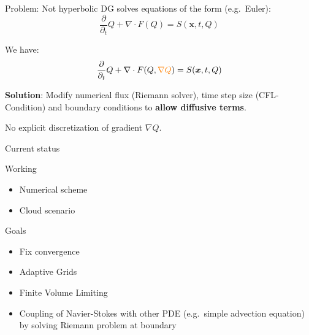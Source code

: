 \documentclass{beamer}
\begin{document}
\begin{frame}{Problem: Not hyperbolic}
  DG solves equations of the form (e.g.\ Euler):
  \begin{equation}
  \label{eq:conservation-law}
 \frac{\partial}{\partial_t}  Q + \nabla \cdot F(Q) = S(\bm{x}, t, Q)
\end{equation}

We have:
\begin{equation}
  \label{eq:conservation-law}
 \frac{\partial}{\partial_t}  Q + \nabla \cdot F(Q, \textcolor{orange}{\nabla Q}) = S(\bm{x}, t, Q)
\end{equation}

\textbf{Solution}:
Modify numerical flux (Riemann solver), time step size (CFL-Condition) and boundary conditions to \textbf{allow diffusive terms}.

\alert{No explicit discretization} of gradient $\nabla Q$.
\end{frame}

\begin{frame}{Current status}
  \begin{block}{Working}
  \begin{itemize}
  \item Numerical scheme
  \item Cloud scenario
  \end{itemize}
  \end{block}

  \begin{block}{Goals}
  \begin{itemize}
  \item Fix convergence
  \item Adaptive Grids
  \item Finite Volume Limiting
  \item Coupling of Navier-Stokes with other PDE (e.g.\ simple advection equation) by solving Riemann problem at boundary
  \end{itemize}
  \end{block}
\end{frame}

\begin{frame}{Current status of Convergence-Tests}
  \begin{figure}[h]
    \centering
   \texttt{[image: \{l2\_error]}}
    \caption{Mesh-Size vs $L_2$ error }
    \label{fig:l2-error}
  \end{figure}
\end{frame}
\end{document}
